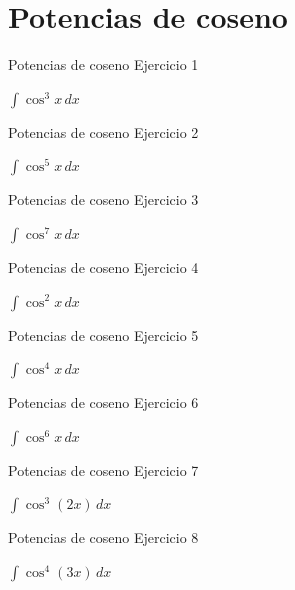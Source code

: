 \documentclass[10pt,aspectratio=169]{beamer}
\newcommand{\ejercicio}[1]{%
  \begin{center}
  \vfill
  {\fontsize{24}{30}\selectfont #1}
  \vfill
  \end{center}
}
\begin{document}
\section{Potencias de coseno}
\begin{frame}{Potencias de coseno}
\small Ejercicio 1
\ejercicio{$\displaystyle \int \cos^3 x\,dx$}
\end{frame}
\begin{frame}{Potencias de coseno}
\small Ejercicio 2
\ejercicio{$\displaystyle \int \cos^5 x\,dx$}
\end{frame}
\begin{frame}{Potencias de coseno}
\small Ejercicio 3
\ejercicio{$\displaystyle \int \cos^7 x\,dx$}
\end{frame}
\begin{frame}{Potencias de coseno}
\small Ejercicio 4
\ejercicio{$\displaystyle \int \cos^2 x\,dx$}
\end{frame}
\begin{frame}{Potencias de coseno}
\small Ejercicio 5
\ejercicio{$\displaystyle \int \cos^4 x\,dx$}
\end{frame}
\begin{frame}{Potencias de coseno}
\small Ejercicio 6
\ejercicio{$\displaystyle \int \cos^6 x\,dx$}
\end{frame}
\begin{frame}{Potencias de coseno}
\small Ejercicio 7
\ejercicio{$\displaystyle \int \cos^3(2x)\,dx$}
\end{frame}
\begin{frame}{Potencias de coseno}
\small Ejercicio 8
\ejercicio{$\displaystyle \int \cos^4(3x)\,dx$}
\end{frame}

\end{document}
